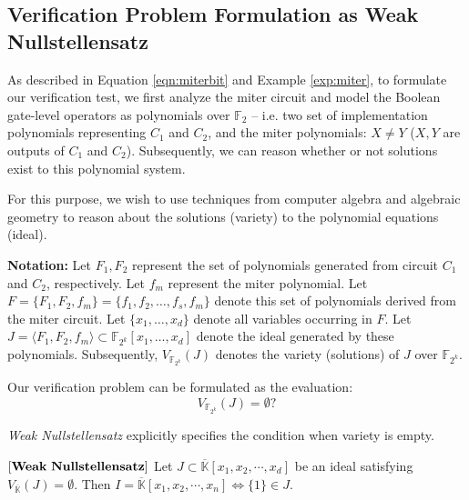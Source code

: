 \subsection{Verification Problem Formulation as Weak Nullstellensatz}

As described in Equation \ref{eqn:miterbit} and Example \ref{exp:miter},
to formulate our verification test, we first analyze the miter circuit and 
model the Boolean gate-level operators as polynomials over $\mathbb{F}_2$
-- i.e. two set of implementation polynomials representing $C_{1}$ and $C_{2}$, 
and the miter polynomials: $X \neq Y$ ($X,Y$ are outputs of $C_{1}$ and $C_{2}$). 
Subsequently, we can reason whether or not solutions exist
to this polynomial system. 

For this purpose, we wish to use techniques from computer algebra and
algebraic geometry to reason about the solutions (variety) to the
polynomial equations (ideal).  

{\bf {Notation:}} Let $F_1, F_2$ represent the set of
polynomials 
generated from circuit $C_1$ and 
$C_2$, respectively. Let $f_m$ represent the miter polynomial. Let
$F=\{F_1,F_2,f_m\}=\{f_1,f_2,\ldots,f_s, f_m\}$ denote this set of
polynomials derived from the miter circuit.  Let $\{x_1,\dots,x_d\}$
denote all variables occurring in $F$. Let $J = \langle
F_1,F_2, f_m\rangle \subset \mathbb{F}_{2^k}[x_{1},\dots,x_{d}]$
denote the ideal generated by these polynomials. 
Subsequently, $V_{\mathbb{F}_{2^k}}(J)$ denotes the variety
(solutions) of $J$ over $\mathbb{F}_{2^k}$. 

Our verification problem
can be formulated as the evaluation: 
\begin{equation}
V_{\mathbb{F}_{2^k}}(J)=\emptyset?
\end{equation}


{\it Weak  Nullstellensatz} \cite{null:1890} explicitly specifies the
condition when variety is empty. 

\begin{Theorem}
$\left[\bf{Weak\  Nullstellensatz}\right]$ Let $J \subset \overline
{\mathbb{K}}[x_1, x_2, \cdots, x_d]$ be an ideal satisfying
$V_{\overline{\mathbb{K}}}(J)=\emptyset$. Then $I=\overline {\mathbb{K}}[x_1,
x_2, \cdots, x_n] \iff \{1\} \in J$. 
\end{Theorem}

